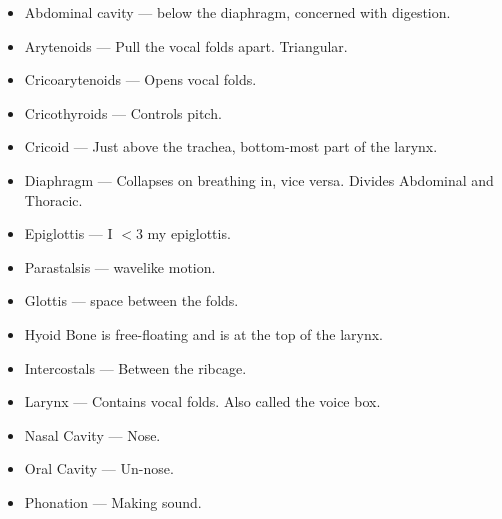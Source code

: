 \documentclass[11pt]{article}
\begin{document}
\begin{itemize}
	\item Abdominal cavity --- below the diaphragm, concerned with digestion.
	\item Arytenoids --- Pull the vocal folds apart.  Triangular.
	\item Cricoarytenoids --- Opens vocal folds.
	\item Cricothyroids --- Controls pitch.
	\item Cricoid --- Just above the trachea, bottom-most part of the larynx.
	\item Diaphragm --- Collapses on breathing in, vice versa.  Divides Abdominal
		and Thoracic.
	\item Epiglottis --- I $<3$ my epiglottis.
	\item Parastalsis --- wavelike motion.
	\item Glottis --- space between the folds.
	\item Hyoid Bone is free-floating and is at the top of the larynx.
	\item Intercostals --- Between the ribcage.
	\item Larynx --- Contains vocal folds.  Also called the voice box.
	\item Nasal Cavity --- Nose.
	\item Oral Cavity --- Un-nose.
	\item Phonation --- Making sound.
\end{itemize}
\end{document}
